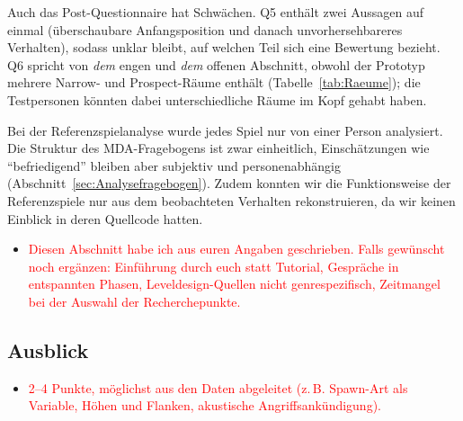 \documentclass[../Main.tex]{subfiles}
\begin{document}
Auch das Post-Questionnaire hat Schwächen. Q5 enthält zwei Aussagen auf einmal (überschaubare Anfangsposition und danach unvorhersehbareres Verhalten), sodass unklar bleibt, auf welchen Teil sich eine Bewertung bezieht. Q6 spricht von \emph{dem} engen und \emph{dem} offenen Abschnitt, obwohl der Prototyp mehrere Narrow- und Prospect-Räume enthält (Tabelle~\ref{tab:Raeume}); die Testpersonen könnten dabei unterschiedliche Räume im Kopf gehabt haben.

Bei der Referenzspielanalyse wurde jedes Spiel nur von einer Person analysiert. Die Struktur des MDA-Fragebogens ist zwar einheitlich, Einschätzungen wie \enquote{befriedigend} bleiben aber subjektiv und personenabhängig (Abschnitt~\ref{sec:Analysefragebogen}). Zudem konnten wir die Funktionsweise der Referenzspiele nur aus dem beobachteten Verhalten rekonstruieren, da wir keinen Einblick in deren Quellcode hatten.

\begin{itemize}[leftmargin=1.5cm]
    \item \textcolor{red}{Diesen Abschnitt habe ich aus euren Angaben geschrieben. Falls gewünscht noch ergänzen: Einführung durch euch statt Tutorial, Gespräche in entspannten Phasen, Leveldesign-Quellen nicht genrespezifisch, Zeitmangel bei der Auswahl der Recherchepunkte.}
\end{itemize}

\subsection{Ausblick}

\begin{itemize}[leftmargin=1.5cm]
    \item \textcolor{red}{2--4 Punkte, möglichst aus den Daten abgeleitet (z.\,B. Spawn-Art als Variable, Höhen und Flanken, akustische Angriffsankündigung).}
\end{itemize}
\end{document}
